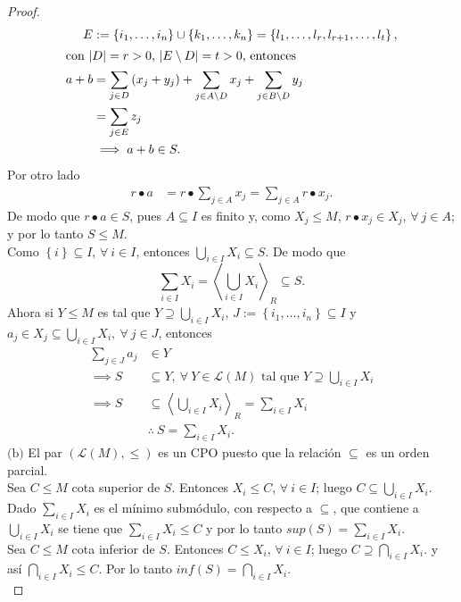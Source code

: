 \documentclass{article}
\newcommand{\crdnlty}[1]{
	\left|#1\right|
}
\newcommand{\lrprth}[1]{
	\left(#1\right)
}
\newcommand{\lrbrack}[1]{
	\left\{#1\right\}
}
\newcommand{\gengroup}[1]{
	\left< #1\right>
}
\newcommand{\genlin}[1]{
	\mathscr{L}\lrprth{#1}
}
\theoremstyle{definition}
\theoremstyle{plain}
\theoremstyle{plain}
\theoremstyle{definition}
\theoremstyle{definition}
\theoremstyle{definition}
\theoremstyle{definition}
\theoremstyle{definition}
\theoremstyle{definition}
\begin{document}
\begin{enumerate}
\begin{proof}
\begin{align*}
		E&:=\lrbrack{i_1,\dotsc,i_n}\cup
		\lrbrack{k_1,\dotsc,k_n}=\lrbrack{l_1,\dotsc,l_{r},l_{r+1},\dotsc,l_{t}},\\
		\intertext{con $\crdnlty{D}=r>0$, $\crdnlty{E\setminus D}=t>0$, entonces}
		a+b&=\sum_{j\in D}\lrprth{x_j+y_j}+\sum_{j\in A\setminus D}x_j+\sum_{j\in B\setminus D}y_j \\
		&=\sum_{j\in E}z_j\\
		&\implies a+b\in S.
	\end{align*}
	Por otro lado
	\begin{align*}
		r\bullet a&=r\bullet\sum_{j\in A}x_j=\sum_{j\in A}r\bullet x_j.
	\end{align*}
	De modo que $r\bullet a\in S$, pues $A\subseteq I$ es finito y, como $X_j\leq M$, $r\bullet x_j\in X_j$, $\forall\ j\in A$; y por lo tanto $S\leq M$. \\
	Como $\lrbrack{i}\subseteq I$, $\forall\ i\in I$, entonces
	$\bigcup_{i\in I}X_i\subseteq S$. De modo que
	\begin{equation*}
		\sum_{i\in I}X_i=\gengroup{\bigcup_{i\in I}X_i}_R\subseteq S.
	\end{equation*}
	Ahora si $Y\leq M$ es tal que $Y\supseteq \bigcup_{i\in I}X_i$, $J:=\lrbrack{i_1,\dotsc,i_n}\subseteq I$ y $a_j\in X_j\subseteq\bigcup_{i\in I}X_i,\ \forall\ j\in J$, entonces
	\begin{align*}
		\sum_{j\in J}a_j&\in Y\\
		\implies S&\subseteq Y,\ \forall\ Y\in\genlin{M}\text{ tal que } Y\supseteq \bigcup_{i\in I}X_i\\
		\implies S&\subseteq \gengroup{\bigcup_{i\in I}X_i}_R=\sum_{i\in I}X_i\\
		&\therefore\ S=\sum_{i\in I}X_i.
	\end{align*}
	$\boxed{\text{(b)}}$ El par $(\genlin{M},\leq)$ es un CPO puesto que la relación $\subseteq$ es un orden parcial.\\
	Sea $C\leq M$ cota superior de $S$. Entonces $X_i\leq C$, $\forall\ i\in I$; luego $C\subseteq \bigcup_{i\in I}X_i$. Dado $\sum_{i\in I}X_i$ es el mínimo submódulo, con respecto a $\subseteq$, que contiene a $\bigcup_{i\in I}X_i$ se tiene que $\sum_{i\in I}X_i\leq C$ y por lo tanto $sup\lrprth{S}=\sum_{i\in I}X_i$.\\
	Sea $C\leq M$ cota inferior de $S$. Entonces $C\leq X_i$, $\forall\ i\in I$; luego $C\supseteq \bigcap_{i\in I}X_i$. y así $\bigcap_{i\in I}X_i\leq C$. Por lo tanto $inf\lrprth{S}=\bigcap_{i\in I}X_i$.\\
	\begin{equation*}

\end{equation*}
\end{proof}
\end{enumerate}
\end{document}
